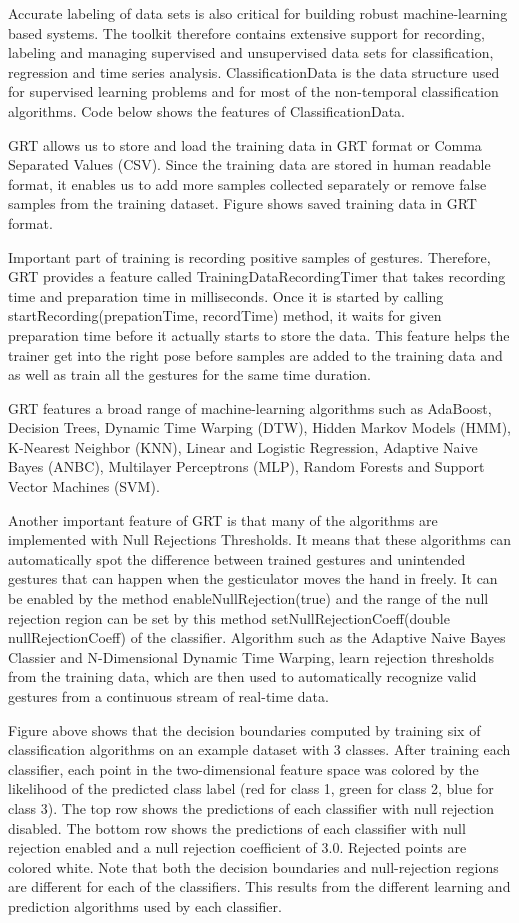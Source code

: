 Accurate labeling of data sets is also critical for building robust machine-learning based systems. The toolkit therefore contains extensive support for recording, labeling and managing supervised and unsupervised data sets for classification, regression and time series analysis. ClassificationData is the data structure used for supervised learning problems and for most of the non-temporal classification algorithms. Code below shows the features of ClassificationData.

GRT allows us to store and load the training data in GRT format or Comma Separated Values (CSV). Since the training data are stored in human readable format, it enables us to add more samples collected separately or remove false samples from the training dataset. Figure shows saved training data in GRT format.

Important part of training is recording positive samples of gestures. Therefore, GRT provides a feature called TrainingDataRecordingTimer that takes recording time and preparation time in milliseconds. Once it is started by calling startRecording(prepationTime, recordTime) method, it waits for given preparation time before it actually starts to store the data. This feature helps the trainer get into the right pose before samples are added to the training data and as well as train all the gestures for the same time duration.

GRT features a broad range of machine-learning algorithms such as AdaBoost, Decision Trees, Dynamic Time Warping (DTW), Hidden Markov Models (HMM), K-Nearest Neighbor (KNN), Linear and Logistic Regression, Adaptive Naive Bayes (ANBC), Multilayer Perceptrons (MLP), Random Forests and Support Vector Machines (SVM). 

Another important feature of GRT is that many of the algorithms are implemented with Null Rejections Thresholds. It means that these algorithms can automatically spot the difference between trained gestures and unintended gestures that can happen when the gesticulator moves the hand in freely. It can be enabled by the method enableNullRejection(true) and the range of the null rejection region can be set by this method setNullRejectionCoeff(double nullRejectionCoeff) of the classifier. Algorithm such as the Adaptive Naive Bayes Classier and N-Dimensional Dynamic Time Warping, learn rejection thresholds from the training data, which are then used to automatically recognize valid gestures from a continuous stream of real-time data.

Figure above shows that the decision boundaries computed by training six of classification algorithms on an example dataset with 3 classes. After training each classifier, each point in the two-dimensional feature space was colored by the likelihood of the predicted class label (red for class 1, green for class 2, blue for class 3). The top row shows the predictions of each classifier with null rejection disabled. The bottom row shows the predictions of each classifier with null rejection enabled and a null rejection coefficient of 3.0. Rejected points are colored white. Note that both the decision boundaries and null-rejection regions are different for each of the classifiers. This results from the different learning and prediction algorithms used by each classifier. 

